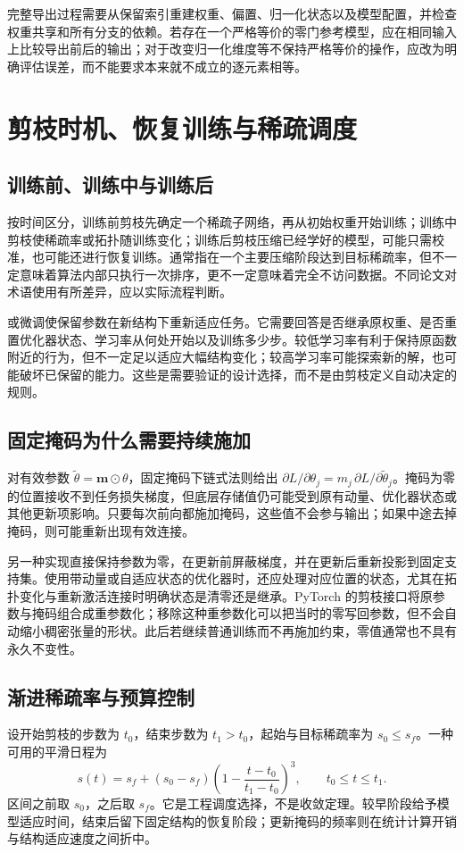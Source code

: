 \documentclass[UTF8,12pt,a4paper,fontset=fandol]{ctexart}
\begin{document}
完整导出过程需要从保留索引重建权重、偏置、归一化状态以及模型配置，并检查权重共享和所有分支的依赖。若存在一个严格等价的零门参考模型，应在相同输入上比较导出前后的输出；对于改变归一化维度等不保持严格等价的操作，应改为明确评估误差，而不能要求本来就不成立的逐元素相等。

\section{剪枝时机、恢复训练与稀疏调度}
\label{sec:prune-training}

\subsection{训练前、训练中与训练后}
按时间区分，训练前剪枝先确定一个稀疏子网络，再从初始权重开始训练；训练中剪枝使稀疏率或拓扑随训练变化；训练后剪枝压缩已经学好的模型，可能只需校准，也可能还进行恢复训练。通常指在一个主要压缩阶段达到目标稀疏率，但不一定意味着算法内部只执行一次排序，更不一定意味着完全不访问数据。不同论文对术语使用有所差异，应以实际流程判断。

或微调使保留参数在新结构下重新适应任务。它需要回答是否继承原权重、是否重置优化器状态、学习率从何处开始以及训练多少步。较低学习率有利于保持原函数附近的行为，但不一定足以适应大幅结构变化；较高学习率可能探索新的解，也可能破坏已保留的能力。这些是需要验证的设计选择，而不是由剪枝定义自动决定的规则。

\subsection{固定掩码为什么需要持续施加}
对有效参数 $\widetilde\theta=\mathbf m\odot\theta$，固定掩码下链式法则给出 $\partial L/\partial\theta_j=m_j\,\partial L/\partial\widetilde\theta_j$。掩码为零的位置接收不到任务损失梯度，但底层存储值仍可能受到原有动量、优化器状态或其他更新项影响。只要每次前向都施加掩码，这些值不会参与输出；如果中途去掉掩码，则可能重新出现有效连接。

另一种实现直接保持参数为零，在更新前屏蔽梯度，并在更新后重新投影到固定支持集。使用带动量或自适应状态的优化器时，还应处理对应位置的状态，尤其在拓扑变化与重新激活连接时明确状态是清零还是继承。PyTorch 的剪枝接口将原参数与掩码组合成重参数化；移除这种重参数化可以把当时的零写回参数，但不会自动缩小稠密张量的形状\cite{pytorchprune}。此后若继续普通训练而不再施加约束，零值通常也不具有永久不变性。

\subsection{渐进稀疏率与预算控制}
设开始剪枝的步数为 $t_0$，结束步数为 $t_1>t_0$，起始与目标稀疏率为 $s_0\leq s_f$。一种可用的平滑日程为
\begin{equation}
 s(t)=s_f+(s_0-s_f)
 \left(1-\frac{t-t_0}{t_1-t_0}\right)^3,
 \qquad t_0\leq t\leq t_1.
 \label{eq:prune-schedule}
\end{equation}
区间之前取 $s_0$，之后取 $s_f$。它是工程调度选择，不是收敛定理。较早阶段给予模型适应时间，结束后留下固定结构的恢复阶段；更新掩码的频率则在统计计算开销与结构适应速度之间折中。
\end{document}
